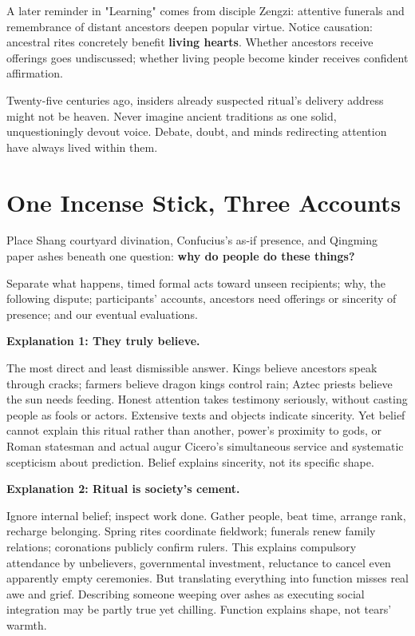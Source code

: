 A later reminder in "Learning" comes from disciple Zengzi: attentive funerals and remembrance of distant ancestors deepen popular virtue. Notice causation: ancestral rites concretely benefit \textbf{living hearts}. Whether ancestors receive offerings goes undiscussed; whether living people become kinder receives confident affirmation.

Twenty-five centuries ago, insiders already suspected ritual's delivery address might not be heaven. Never imagine ancient traditions as one solid, unquestioningly devout voice. Debate, doubt, and minds redirecting attention have always lived within them.

\section{One Incense Stick, Three Accounts}
Place Shang courtyard divination, Confucius's as-if presence, and Qingming paper ashes beneath one question: \textbf{why do people do these things?}

Separate what happens, timed formal acts toward unseen recipients; why, the following dispute; participants' accounts, ancestors need offerings or sincerity of presence; and our eventual evaluations.

\textbf{Explanation 1: They truly believe.}

The most direct and least dismissible answer. Kings believe ancestors speak through cracks; farmers believe dragon kings control rain; Aztec priests believe the sun needs feeding. Honest attention takes testimony seriously, without casting people as fools or actors. Extensive texts and objects indicate sincerity. Yet belief cannot explain this ritual rather than another, power's proximity to gods, or Roman statesman and actual augur Cicero's simultaneous service and systematic scepticism about prediction. Belief explains sincerity, not its specific shape.

\textbf{Explanation 2: Ritual is society's cement.}

Ignore internal belief; inspect work done. Gather people, beat time, arrange rank, recharge belonging. Spring rites coordinate fieldwork; funerals renew family relations; coronations publicly confirm rulers. This explains compulsory attendance by unbelievers, governmental investment, reluctance to cancel even apparently empty ceremonies. But translating everything into function misses real awe and grief. Describing someone weeping over ashes as executing social integration may be partly true yet chilling. Function explains shape, not tears' warmth.

